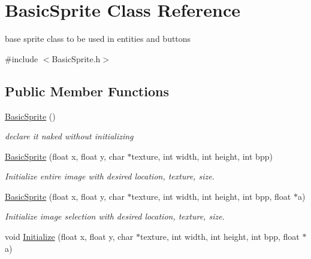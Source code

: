 \hypertarget{class_basic_sprite}{}\section{Basic\+Sprite Class Reference}
\label{class_basic_sprite}


base sprite class to be used in entities and buttons  




{\ttfamily \#include $<$Basic\+Sprite.\+h$>$}

\subsection*{Public Member Functions}
\begin{DoxyCompactItemize}
\item 
\hypertarget{class_basic_sprite_a656c8a42b1d1efce69d92f96ccd023cd}{}\hyperlink{class_basic_sprite_a656c8a42b1d1efce69d92f96ccd023cd}{Basic\+Sprite} ()\label{class_basic_sprite_a656c8a42b1d1efce69d92f96ccd023cd}

\begin{DoxyCompactList}\small\item\em declare it naked without initializing \end{DoxyCompactList}\item 
\hypertarget{class_basic_sprite_a7ae18aba893f408422bc0b3ba83f6ae4}{}\hyperlink{class_basic_sprite_a7ae18aba893f408422bc0b3ba83f6ae4}{Basic\+Sprite} (float x, float y, char $\ast$texture, int width, int height, int bpp)\label{class_basic_sprite_a7ae18aba893f408422bc0b3ba83f6ae4}

\begin{DoxyCompactList}\small\item\em Initialize entire image with desired location, texture, size. \end{DoxyCompactList}\item 
\hypertarget{class_basic_sprite_aa0d07db3e1d0481302a2495b749c7b8c}{}\hyperlink{class_basic_sprite_aa0d07db3e1d0481302a2495b749c7b8c}{Basic\+Sprite} (float x, float y, char $\ast$texture, int width, int height, int bpp, float $\ast$a)\label{class_basic_sprite_aa0d07db3e1d0481302a2495b749c7b8c}

\begin{DoxyCompactList}\small\item\em Initialize image selection with desired location, texture, size. \end{DoxyCompactList}\item 
\hypertarget{class_basic_sprite_ad9eb07d0b4c51ed3e853ed01b1e9adbe}{}void \hyperlink{class_basic_sprite_ad9eb07d0b4c51ed3e853ed01b1e9adbe}{Initialize} (float x, float y, char $\ast$texture, int width, int height, int bpp, float $\ast$a)\label{class_basic_sprite_ad9eb07d0b4c51ed3e853ed01b1e9adbe}


\end{DoxyCompactItemize}
